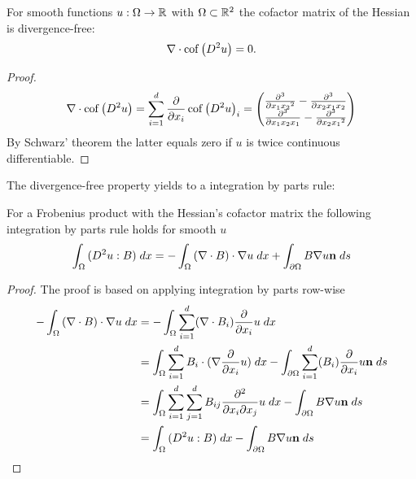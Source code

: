 \begin{lemma} \label{la: divergence free cof}
For smooth functions $u:\Omega \rightarrow \mathbb{R}$ with $\Omega \subset \mathbb{R}^2$ the cofactor matrix of the Hessian is divergence-free:
\[
	\nabla \cdot \operatorname{cof} \left( D^2 u \right) = 0.
\] 
\end{lemma}
\begin{proof}
\begin{align*}
	\nabla \cdot \operatorname{cof} \left( D^2 u \right) = \sum_{i=1}^{d} \frac \partial {\partial  x_i}\operatorname{cof} \left( D^2 u \right)_i = 
	\begin{pmatrix}
		\frac {\partial^3} {\partial x_1 {x_2}^2 } -\frac {\partial^3} {\partial{x_2} x_1 {x_2}} \\
				\frac {\partial^3} {\partial {x_1}x_2 {x_1}} -\frac {\partial^3} {\partial x_2 {x_1}^2 }
	\end{pmatrix}
\end{align*}
By Schwarz' theorem the latter equals zero if $u$ is twice continuous differentiable.
\end{proof}

The divergence-free property yields to a integration by parts rule:
\begin{lemma} \label{la: integration by parts Frobenius}
For a Frobenius product with the Hessian's cofactor matrix  the following integration by parts rule holds for smooth $u$
\[
	\int_{\Omega} {{ (D^2 u : B)}\;dx} = 
		- \int_{\Omega} {{ (\nabla \cdot B) \cdot \nabla u }\;dx}
		+ \int_{\partial \Omega} {{  B \nabla u \bf n}\;ds}
\] 
\end{lemma}

\begin{proof}
The proof is based on applying integration by parts row-wise
\begin{align*}
- \int_{\Omega} {{ (\nabla \cdot B) \cdot \nabla u}\;dx} &= 
- \int_{\Omega} {{ \sum_{i = 1}^{d} (\nabla \cdot B_i) \frac \partial {\partial x_i} u}\;dx} \\
&=  \int_{\Omega} {{ \sum_{i = 1}^{d} B_i \cdot  (\nabla \frac \partial {\partial x_i} u)}\;dx} 
	- \int_{\partial \Omega} {{ \sum_{i = 1}^{d} (B_i) \frac \partial {\partial x_i} u \mathbf{n}}\;ds} \\
&=  \int_{\Omega} {{ \sum_{i = 1}^{d}\sum_{j= 1}^{d} B_{ij} \frac {\partial^2} {\partial x_i\partial x_j} u}\;dx}
	- \int_{\partial \Omega} {{ B \nabla u \mathbf{n}}\;ds} \\
&=  \int_{\Omega} {{ (D^2 u : B)}\;dx}
	- \int_{\partial \Omega} {{ B \nabla u \mathbf{n} }\;ds}
\end{align*}
\end{proof}

